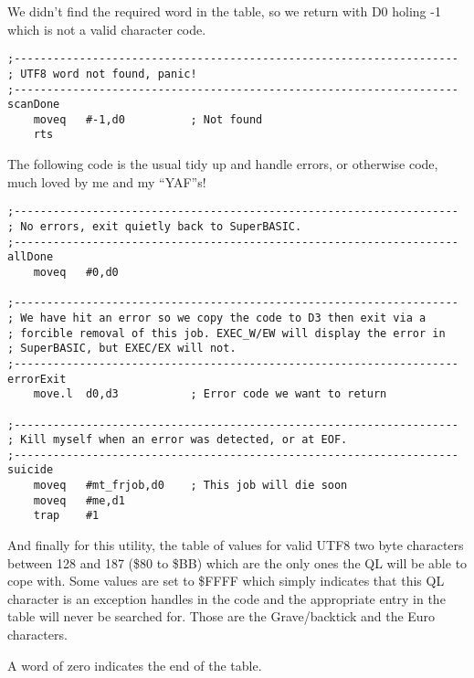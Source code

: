 We didn't find the required word in the table, so we return with D0
holing -1 which is not a valid character code.

\begin{lstlisting}[firstnumber=last,caption={Utf82Ql: Missing UTF8 word}]
;--------------------------------------------------------------------
; UTF8 word not found, panic!
;--------------------------------------------------------------------
scanDone
    moveq   #-1,d0          ; Not found
    rts
\end{lstlisting}

The following code is the usual tidy up and handle errors, or otherwise
code, much loved by me and my ``YAF''s!

\begin{lstlisting}[firstnumber=last,caption={Utf82Ql: Clean up and exit handling}]
;--------------------------------------------------------------------
; No errors, exit quietly back to SuperBASIC.
;--------------------------------------------------------------------
allDone
    moveq   #0,d0

;--------------------------------------------------------------------
; We have hit an error so we copy the code to D3 then exit via a
; forcible removal of this job. EXEC_W/EW will display the error in
; SuperBASIC, but EXEC/EX will not.
;--------------------------------------------------------------------
errorExit
    move.l  d0,d3           ; Error code we want to return

;--------------------------------------------------------------------
; Kill myself when an error was detected, or at EOF.
;--------------------------------------------------------------------
suicide
    moveq   #mt_frjob,d0    ; This job will die soon
    moveq   #me,d1
    trap    #1
\end{lstlisting}

And finally for this utility, the table of values for valid UTF8 two
byte characters between 128 and 187 (\$80 to \$BB) which are the only
ones the QL will be able to cope with. Some values are set to \$FFFF
which simply indicates that this QL character is an exception handles
in the code and the appropriate entry in the table will never be searched
for. Those are the Grave/backtick and the Euro characters.

A word of zero indicates the end of the table.

